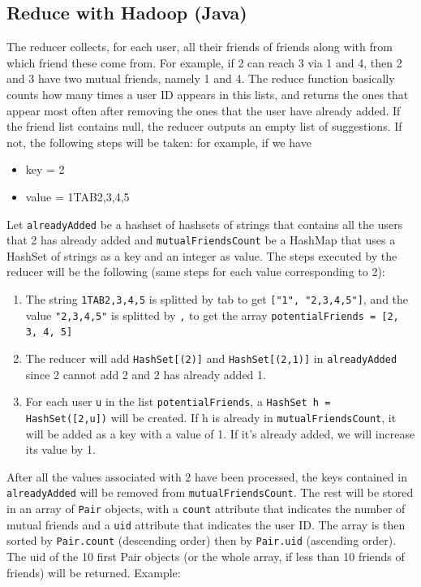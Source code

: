 \documentclass[11pt]{article}
\begin{document}
\begin{justifying}
\subsection{Reduce with Hadoop (Java)}
The reducer collects, for each user, all their friends of friends along with from which friend these come from. For example, if 2 can reach 3 via 1 and 4, then 2 and 3 have two mutual friends, namely 1 and 4. The reduce function basically counts how many times a user ID appears in this lists, and returns the ones that appear most often after removing the ones that the user have already added. If the friend list contains null, the reducer outputs an empty list of suggestions. If not, the following steps will be taken: for example, if we have
\begin{itemize}
    \item key \space \space \space = 2
    \item value = 1TAB2,3,4,5
\end{itemize}
Let \verb|alreadyAdded| be a hashset of hashsets of strings that contains all the users that 2 has already added and \verb|mutualFriendsCount| be a HashMap that uses a HashSet of strings as a key and an integer as value. The steps executed by the reducer will be the following (same steps for each value corresponding to 2):
\begin{enumerate}
    \item The string \verb|1TAB2,3,4,5| is splitted by tab to get \verb|["1", "2,3,4,5"]|, and the value \verb|"2,3,4,5"| is splitted by \verb|,| to get the array \verb|potentialFriends = [2, 3, 4, 5]|
    \item The reducer will add \verb|HashSet[(2)]| and \verb|HashSet[(2,1)]| in \verb|alreadyAdded| since 2 cannot add 2 and 2 has already added 1.
    \item  For each user \verb|u| in the list \verb|potentialFriends|, a \verb|HashSet h = HashSet([2,u])| will be created. If h is already in \verb|mutualFriendsCount|, it will be added as a key with a value of 1. If it's already added, we will increase its value by 1.
\end{enumerate}
After all the values associated with 2 have been processed, the keys contained in \verb|alreadyAdded| will be removed from \verb|mutualFriendsCount|. The rest will be stored in an array of \verb|Pair| objects, with a \verb|count| attribute that indicates the number of mutual friends and a \verb|uid| attribute that indicates the user ID. The array is then sorted by \verb|Pair.count| (descending order) then by \verb|Pair.uid| (ascending order). The uid of the 10 first Pair objects (or the whole array, if less than 10 friends of friends) will be returned. Example:

\end{justifying}
\end{document}
